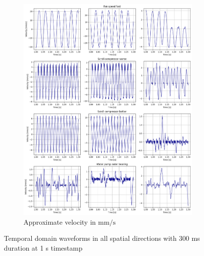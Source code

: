 \begin{figure}[ht]
\begin{subfigure}[b]{0.49\textwidth}
        \includegraphics[width=\textwidth]{assets/design/EDA-custom-dataset-velocity.png}
        \caption{Approximate velocity in $\mathrm{mm/s}$}
    \end{subfigure} 
    \caption{Temporal domain waveforms in all spatial directions with 300 ms duration at 1 s timestamp}
\end{figure}



